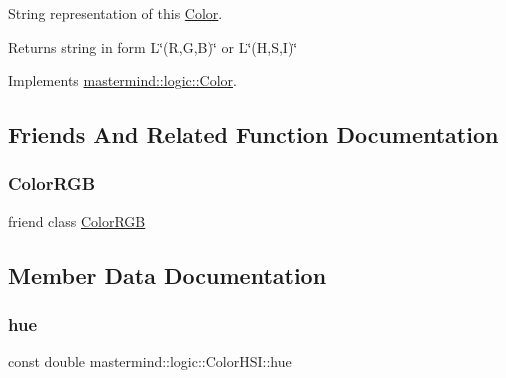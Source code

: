 String representation of this \hyperlink{classmastermind_1_1logic_1_1_color}{Color}. 

\begin{DoxyReturn}{Returns}
string in form {\ttfamily L\char`\"{}(\+R,\+G,\+B)\char`\"{}} or {\ttfamily L\char`\"{}(\+H,\+S,\+I)\char`\"{}} 
\end{DoxyReturn}


Implements \hyperlink{classmastermind_1_1logic_1_1_color_ab911e1ca9d820b7d97c8e014ff75bc49}{mastermind\+::logic\+::\+Color}.



\subsection{Friends And Related Function Documentation}
\hypertarget{classmastermind_1_1logic_1_1_color_h_s_i_ae698553ee9010de895e223e73387f8dc}{}\label{classmastermind_1_1logic_1_1_color_h_s_i_ae698553ee9010de895e223e73387f8dc} 
\subsubsection{\texorpdfstring{Color\+R\+GB}{ColorRGB}}
{\footnotesize\ttfamily friend class \hyperlink{classmastermind_1_1logic_1_1_color_r_g_b}{Color\+R\+GB}\hspace{0.3cm}{\ttfamily [friend]}}



\subsection{Member Data Documentation}
\hypertarget{classmastermind_1_1logic_1_1_color_h_s_i_a2b0bc5fa75a9c03ffe9ae4ebd9cc786c}{}\label{classmastermind_1_1logic_1_1_color_h_s_i_a2b0bc5fa75a9c03ffe9ae4ebd9cc786c} 
\subsubsection{\texorpdfstring{hue}{hue}}
{\footnotesize\ttfamily const double mastermind\+::logic\+::\+Color\+H\+S\+I\+::hue\hspace{0.3cm}{\ttfamily [private]}}



